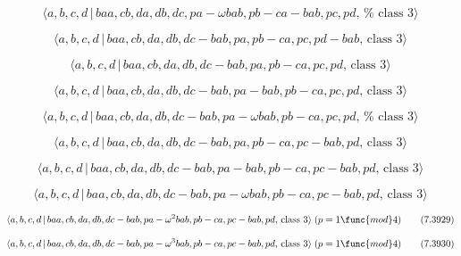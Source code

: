 \documentclass[10pt]{article}
\begin{document}
\begin{equation}
\langle a,b,c,d\,|\,baa,cb,da,db,dc,pa-\omega bab,pb-ca-bab,pc,pd,\,\text{%
class }3\rangle  \tag{7.3921}
\end{equation}

\begin{equation}
\langle a,b,c,d\,|\,baa,cb,da,db,dc-bab,pa,pb-ca,pc,pd-bab,\,\text{class }%
3\rangle  \tag{7.3922}
\end{equation}

\begin{equation}
\langle a,b,c,d\,|\,baa,cb,da,db,dc-bab,pa,pb-ca,pc,pd,\,\text{class }%
3\rangle  \tag{7.3923}
\end{equation}

\begin{equation}
\langle a,b,c,d\,|\,baa,cb,da,db,dc-bab,pa-bab,pb-ca,pc,pd,\,\text{class }%
3\rangle  \tag{7.3924}
\end{equation}

\begin{equation}
\langle a,b,c,d\,|\,baa,cb,da,db,dc-bab,pa-\omega bab,pb-ca,pc,pd,\,\text{%
class }3\rangle  \tag{7.3925}
\end{equation}

\begin{equation}
\langle a,b,c,d\,|\,baa,cb,da,db,dc-bab,pa,pb-ca,pc-bab,pd,\,\text{class }%
3\rangle  \tag{7.3926}
\end{equation}

\begin{equation}
\langle a,b,c,d\,|\,baa,cb,da,db,dc-bab,pa-bab,pb-ca,pc-bab,pd,\,\text{class 
}3\rangle  \tag{7.3927}
\end{equation}

\begin{equation}
\langle a,b,c,d\,|\,baa,cb,da,db,dc-bab,pa-\omega bab,pb-ca,pc-bab,pd,\,%
\text{class }3\rangle  \tag{7.3928}
\end{equation}

\begin{equation}
\langle a,b,c,d\,|\,baa,cb,da,db,dc-bab,pa-\omega ^{2}bab,pb-ca,pc-bab,pd,\,%
\text{class }3\rangle \;(p=1\func{mod}4)  \tag{7.3929}
\end{equation}

\begin{equation}
\langle a,b,c,d\,|\,baa,cb,da,db,dc-bab,pa-\omega ^{3}bab,pb-ca,pc-bab,pd,\,%
\text{class }3\rangle \;(p=1\func{mod}4)  \tag{7.3930}
\end{equation}
\end{document}
